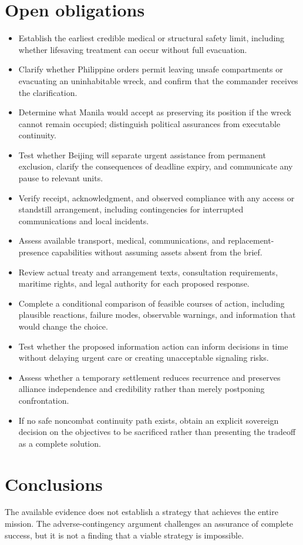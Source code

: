 \documentclass[11pt]{article}
\begin{document}
\section{Open obligations}
\begin{itemize}
\item Establish the earliest credible medical or structural safety limit, including whether lifesaving treatment can occur without full evacuation.
\item Clarify whether Philippine orders permit leaving unsafe compartments or evacuating an uninhabitable wreck, and confirm that the commander receives the clarification.
\item Determine what Manila would accept as preserving its position if the wreck cannot remain occupied; distinguish political assurances from executable continuity.
\item Test whether Beijing will separate urgent assistance from permanent exclusion, clarify the consequences of deadline expiry, and communicate any pause to relevant units.
\item Verify receipt, acknowledgment, and observed compliance with any access or standstill arrangement, including contingencies for interrupted communications and local incidents.
\item Assess available transport, medical, communications, and replacement-presence capabilities without assuming assets absent from the brief.
\item Review actual treaty and arrangement texts, consultation requirements, maritime rights, and legal authority for each proposed response.
\item Complete a conditional comparison of feasible courses of action, including plausible reactions, failure modes, observable warnings, and information that would change the choice.
\item Test whether the proposed information action can inform decisions in time without delaying urgent care or creating unacceptable signaling risks.
\item Assess whether a temporary settlement reduces recurrence and preserves alliance independence and credibility rather than merely postponing confrontation.
\item If no safe noncombat continuity path exists, obtain an explicit sovereign decision on the objectives to be sacrificed rather than presenting the tradeoff as a complete solution.
\end{itemize}
\section{Conclusions}
The available evidence does not establish a strategy that achieves the entire mission. The adverse-contingency argument challenges an assurance of complete success, but it is not a finding that a viable strategy is impossible.
\end{document}
